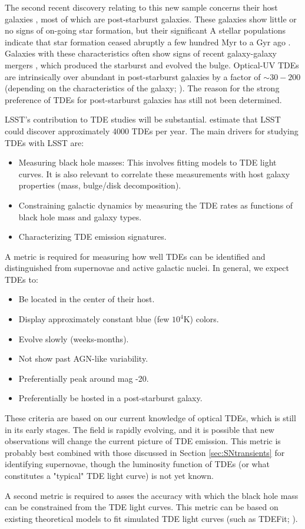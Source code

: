 The second recent discovery relating to this new sample concerns their
host galaxies \citep{Arcavi2014; French2016}, most of which are
post-starburst galaxies. These galaxies show little or no signs of on-going star formation, but their significant A stellar populations indicate that star formation ceased abruptly a few hundred Myr to a Gyr ago \citep{Dressler1983}. Galaxies with these characteristics often show signs of recent galaxy-galaxy mergers \citep{Zabludoff1996}, which produced the starburst and evolved the bulge. Optical-UV TDEs are intrinsically over abundant in post-starburst galaxies by a factor of $\sim30-200$ (depending on the characteristics of the galaxy; \citealt{French et al. 2016}). The reason for the strong preference of TDEs for post-starburst galaxies has still not been determined.

LSST's contribution to TDE studies will be substantial. \citet{VanVelzen2011} estimate that LSST could discover approximately 4000 TDEs per year. The main drivers for studying TDEs with LSST are:
\begin{itemize}
\item Measuring black hole masses: This involves fitting models to TDE light curves. It is also relevant to correlate these measurements with host galaxy properties (mass, bulge/disk decomposition). 
\item Constraining galactic dynamics by measuring the TDE rates as functions of black hole mass and galaxy types. 
\item Characterizing TDE emission signatures. 
\end{itemize}

A metric is required for measuring how well TDEs can be identified and distinguished from supernovae and active galactic nuclei. In general, we expect TDEs to:
\begin{itemize}
\item Be located in the center of their host.
\item Display approximately constant blue (few $10^4$K) colors.
\item Evolve slowly (weeks-months).
\item Not show past AGN-like variability.
\item Preferentially peak around mag -20.
\item Preferentially be hosted in a post-starburst galaxy.
\end{itemize}
These criteria are based on our current knowledge of optical TDEs, which is still in its early stages. The field is rapidly evolving, and it is possible that new observations will change the current picture of TDE emission. 
This metric is probably best combined with those discussed in Section \ref{sec:SNtransients} for identifying supernovae, though the luminosity function of TDEs (or what constitutes a "typical" TDE light curve) is not yet known.

A second metric is required to asses the accuracy with which the black hole mass can be constrained from the TDE light curves. This metric can be based on existing theoretical models to fit simulated TDE light curves (such as TDEFit; \citealt{Guillochon2014}). 


